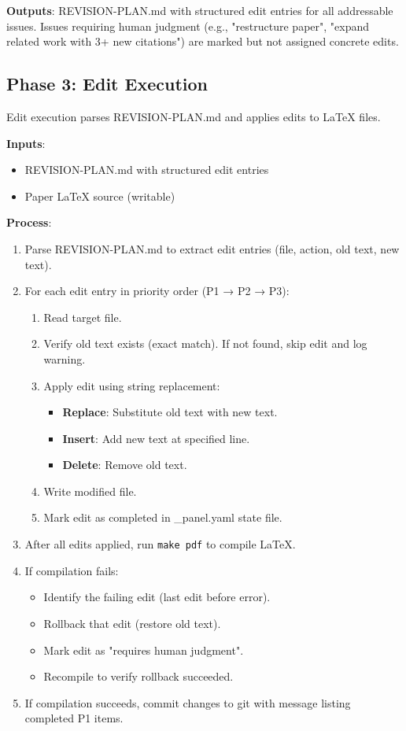 \textbf{Outputs}: REVISION-PLAN.md with structured edit entries for all addressable issues. Issues requiring human judgment (e.g., "restructure paper", "expand related work with 3+ new citations") are marked but not assigned concrete edits.

\subsection{Phase 3: Edit Execution}

Edit execution parses REVISION-PLAN.md and applies edits to LaTeX files.

\textbf{Inputs}:
\begin{itemize}
\item REVISION-PLAN.md with structured edit entries
\item Paper LaTeX source (writable)
\end{itemize}

\textbf{Process}:
\begin{enumerate}
\item Parse REVISION-PLAN.md to extract edit entries (file, action, old text, new text).

\item For each edit entry in priority order (P1 → P2 → P3):
  \begin{enumerate}
  \item Read target file.
  \item Verify old text exists (exact match). If not found, skip edit and log warning.
  \item Apply edit using string replacement:
    \begin{itemize}
    \item \textbf{Replace}: Substitute old text with new text.
    \item \textbf{Insert}: Add new text at specified line.
    \item \textbf{Delete}: Remove old text.
    \end{itemize}
  \item Write modified file.
  \item Mark edit as completed in \_panel.yaml state file.
  \end{enumerate}

\item After all edits applied, run \texttt{make pdf} to compile LaTeX.

\item If compilation fails:
  \begin{itemize}
  \item Identify the failing edit (last edit before error).
  \item Rollback that edit (restore old text).
  \item Mark edit as "requires human judgment".
  \item Recompile to verify rollback succeeded.
  \end{itemize}

\item If compilation succeeds, commit changes to git with message listing completed P1 items.
\end{enumerate}

